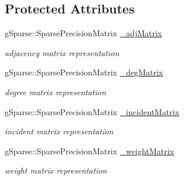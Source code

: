 \subsection*{Protected Attributes}
\begin{DoxyCompactItemize}
\item 
\mbox{\label{classg_sparse_1_1_undirected_graph_ae1365f68c3d3432e0bd538e1355be667}} 
g\+Sparse\+::\+Sparse\+Precision\+Matrix \mbox{\hyperlink{classg_sparse_1_1_undirected_graph_ae1365f68c3d3432e0bd538e1355be667}{\+\_\+adj\+Matrix}}
\begin{DoxyCompactList}\small\item\em adjacency matrix representation \end{DoxyCompactList}\item 
\mbox{\label{classg_sparse_1_1_undirected_graph_a4633cf520000c5aa4640768d0321cc4c}} 
g\+Sparse\+::\+Sparse\+Precision\+Matrix \mbox{\hyperlink{classg_sparse_1_1_undirected_graph_a4633cf520000c5aa4640768d0321cc4c}{\+\_\+deg\+Matrix}}
\begin{DoxyCompactList}\small\item\em degree matrix representation \end{DoxyCompactList}\item 
\mbox{\label{classg_sparse_1_1_undirected_graph_a5b666ae29ef80014ca85ca9bbde83727}} 
g\+Sparse\+::\+Sparse\+Precision\+Matrix \mbox{\hyperlink{classg_sparse_1_1_undirected_graph_a5b666ae29ef80014ca85ca9bbde83727}{\+\_\+incident\+Matrix}}
\begin{DoxyCompactList}\small\item\em incident matrix representation \end{DoxyCompactList}\item 
\mbox{\label{classg_sparse_1_1_undirected_graph_ae84602486ec10f1c09721417e85afcb0}} 
g\+Sparse\+::\+Sparse\+Precision\+Matrix \mbox{\hyperlink{classg_sparse_1_1_undirected_graph_ae84602486ec10f1c09721417e85afcb0}{\+\_\+weight\+Matrix}}
\begin{DoxyCompactList}\small\item\em weight matrix representation \end{DoxyCompactList}\item 

\end{DoxyCompactItemize}
